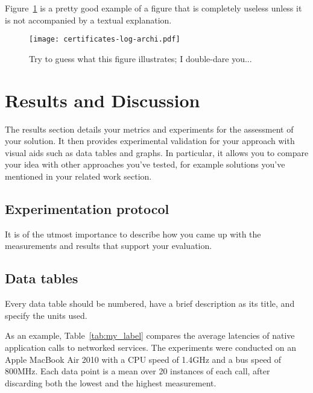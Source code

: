 \documentclass{scrartcl}
\begin{document}
Figure~\ref{fig:log-archi} is a pretty good example of a figure that is completely useless unless it is not accompanied by a textual explanation.

\begin{figure}
	\begin{center}
		\texttt{[image: certificates-log-archi.pdf]}
	\end{center}
	\caption{Try to guess what this figure illustrates; I double-dare you...}
	\label{fig:log-archi}
\end{figure}



\section{Results and Discussion}

The results section details your metrics and experiments for the assessment of your solution. It then provides experimental validation for your approach with visual aids such as data tables and graphs. In particular, it allows you to compare your idea with other approaches you've tested, for example solutions you've mentioned in your related work section.

\subsection{Experimentation protocol}

It is of the utmost importance to describe how you came up with the measurements and results that support your evaluation.

\subsection{Data tables}

Every data table should be numbered, have a brief description as its title, and specify the units used. 

As an example, Table~\ref{tab:my_label} compares the average latencies of native application calls to networked services. The experiments were conducted on an Apple MacBook Air 2010 with a CPU speed of 1.4GHz and a bus speed of 800MHz. Each data point is a mean over 20 instances of each call, after discarding both the lowest and the highest measurement.
\end{document}
